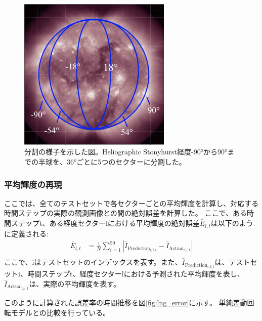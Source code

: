         \begin{figure}[htbp]
          \centering
          \includegraphics[width=0.65\textwidth]{figures/exp1/devision_caption.jpg}
          \caption{分割の様子を示した図。Heliographic Stonyhurst経度-90°から90°までの半球を、36°ごとに5つのセクターに分割した。}
          \label{fig:exp1_division_concept}
        \end{figure}

        \subsubsection{平均輝度の再現}
          ここでは、全てのテストセットで各セクターごとの平均輝度を計算し、対応する時間ステップの実際の観測画像との間の絶対誤差を計算した。
          ここで、ある時間ステップt、ある経度セクターlにおける平均輝度の絶対誤差\( \bar{E}_{l,t} \)は以下のように定義される:
          \begin{align}
            \bar{E}_{l, t} & = \frac{1}{N} \sum_{i=1}^{50} | \bar{I}_{\text{Prediction}_ {i, l, t}} - \bar{I}_{\text{Actual}_{i, l, t}} | \\
          \end{align}
          ここで、iはテストセットのインデックスを表す。また、\( \bar{I}_{\text{Prediction}_{i, l, t}} \)は、テストセットi、時間ステップt、経度セクターlにおける予測された平均輝度を表し、\( \bar{I}_{\text{Actual}_{i, l, t}} \)は、実際の平均輝度を表す。  
            
          このように計算された誤差率の時間推移を図\ref{fig:lng_error}に示す。
          単純差動回転モデルとの比較を行っている。
          

